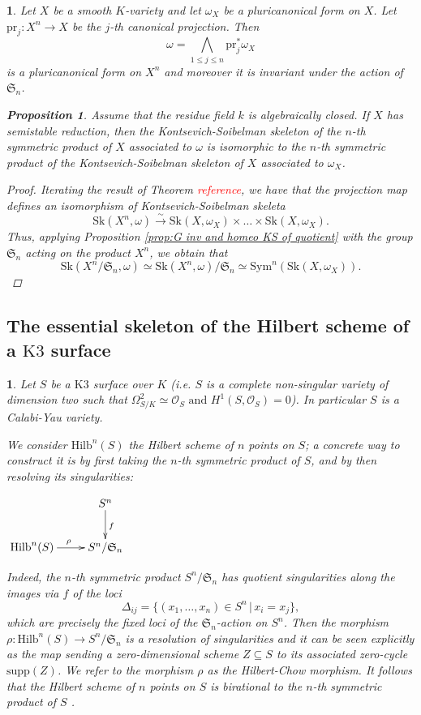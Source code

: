 \documentclass{amsart}%
\numberwithin{equation}{subsection}
\theoremstyle{plain2}
\newtheorem{prop}[equation]{Proposition}
\theoremstyle{definition2}
\theoremstyle{stepstyle}
\theoremstyle{point}
\theoremstyle{subpoint}
\newtheorem{subpoint}[equation]{}%
\newcommand{\spa}[1]{\begin{subpoint}#1\end{subpoint}}           %
\newcommand{\caO}{\ensuremath{\mathcal{O}}}
\newcommand{\Hilb}{\ensuremath{\mathrm{Hilb}}}
\newcommand{\pr}{\mathrm{pr}}
\newcommand{\Sk}{\mathrm{Sk}}
\begin{document}
\spa{Let $X$ be a smooth $K$-variety and let $\omega_X$ be a pluricanonical form on $X$. Let $\pr_j:X^n \rightarrow X$ be the $j$-th canonical projection. Then $$\omega= \bigwedge_{1\leqslant j \leqslant n} \pr_j^*\omega_X$$ is a pluricanonical form on $X^n$ and moreover it is invariant under the action of $\mathfrak{S}_n$.
\begin{prop}  \label{prop semistability and KS symm quotient}
Assume that the residue field $k$ is algebraically closed.  If $X$ has semistable reduction, then the Kontsevich-Soibelman skeleton of the $n$-th symmetric product of $X$ associated to $\omega$ is isomorphic to the $n$-th symmetric product of the Kontsevich-Soibelman skeleton of $X$ associated to $\omega_X$.
\end{prop}
\begin{proof}
Iterating the result of Theorem \textcolor{red}{reference}, we have that the projection map defines an isomorphism of Kontsevich-Soibelman skeleta $$\Sk(X^n, \omega) \xrightarrow{\sim} \Sk(X,\omega_X) \times  \ldots \times \Sk(X,\omega_X).$$ Thus, applying Proposition \ref{prop:G inv and homeo KS of quotient} with the group $\mathfrak{S}_n$ acting on the product $X^n$, we obtain that $$\Sk(X^n/\mathfrak{S}_n, \omega) \simeq \Sk(X^n,\omega)/\mathfrak{S}_n \simeq  \text{Sym}^n(\Sk(X,\omega_X)).$$
\end{proof}
}

\subsection{The essential skeleton of the Hilbert scheme of a $\text{K3}$ surface} \label{sect essential sk Hilb}

\spa{Let $S$ be a $\text{K}3$ surface over $K$ (i.e. $S$ is a complete non-singular variety of dimension two such that $\Omega_{S/K}^2 \simeq \caO_S \text{ and } H^1(S,\caO_S) = 0$). In particular $S$ is a Calabi-Yau variety.

We consider $\Hilb^n(S)$ the Hilbert scheme of $n$ points on $S$; a concrete way to construct it is by first taking the $n$-th symmetric product of $S$, and by then resolving its singularities:
\begin{center}
$ \xymatrix{
& S^n \ar[d]^{f} \\
\Hilb^n(S) \ar[r]^{\rho} & S^n/\mathfrak{S}_n\\
}$
\end{center} Indeed, the $n$-th symmetric product $S^n/\mathfrak{S}_n$ has quotient singularities along the images via $f$ of the loci $$\Delta_{ij}= \{(x_1,\ldots,x_n) \in S^n \,|\, x_i=x_j\},$$ which are precisely the fixed loci of the $\mathfrak{S}_n$-action on $S^n$. Then the morphism $\rho: \Hilb^n(S) \rightarrow S^n/\mathfrak{S}_n$ is a resolution of singularities and it can be seen explicitly as the map sending a zero-dimensional scheme $Z \subseteq S$ to its associated zero-cycle $\text{supp}(Z)$. We refer to the morphism $\rho$ as the Hilbert-Chow morphism. It follows that the Hilbert scheme of $n$ points on $S$ is birational to the $n$-th symmetric product of $S$ \cite{Fogarty}. 
}
\end{document}
